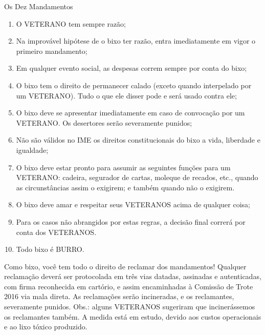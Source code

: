 \begin{editorial}{Os Dez Mandamentos}
  \begin{enumerate}
  \item O VETERANO tem sempre razão;
  \item Na improvável hipótese de o bixo ter razão, entra imediatamente
        em vigor o primeiro mandamento;
  \item Em qualquer evento social, as despesas correm sempre por conta
        do bixo;
  \item O bixo tem o direito de permanecer calado (exceto quando interpelado
        por um VETERANO). Tudo o que ele disser pode e será usado contra ele;
  \item O bixo deve se apresentar imediatamente em caso de convocação por
        um VETERANO. Os desertores serão severamente punidos;
  \item Não são válidos no IME os direitos constitucionais do bixo a vida,
        liberdade e igualdade;
  \item O bixo deve estar pronto para assumir as seguintes funções para um
        VETERANO: cadeira, segurador de cartas, moleque de recados, etc., quando
        as circunstâncias assim o exigirem; e também quando não o exigirem.
  \item O bixo deve amar e respeitar seus VETERANOS acima de qualquer
        coisa;
  \item Para os casos não abrangidos por estas regras, a decisão final
        correrá por conta dos VETERANOS.
  \item Todo bixo é BURRO.
  \end{enumerate}


Como bixo, você tem todo o direito de reclamar dos mandamentos! Qualquer
reclamação deverá ser protocolada em três vias datadas, assinadas e autenticadas,
com firma reconhecida em cartório, e assim encaminhadas à Comissão de Trote 2016 %
via mala direta. As reclamações serão incineradas, e os reclamantes, severamente
punidos. Obs.: alguns VETERANOS sugeriram que incinerássemos os reclamantes também.
A medida está em estudo, devido aos custos operacionais e ao lixo tóxico produzido.

\thispagestyle{empty}
\end{editorial}
